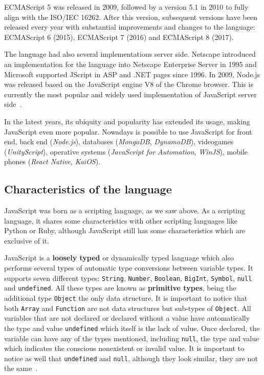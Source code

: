 \documentclass{uvamscse}
\begin{document}
ECMAScript 5 was released in 2009, followed by a version 5.1 in 2010 to fully align with the ISO/IEC 16262. After this version, subsequent versions have been released every year with substantial improvements and changes to the language: ECMAScript 6 (2015), ECMAScript 7 (2016) and ECMAScript 8 (2017).

The language had also several implementations server side. Netscape introduced an implementation for the language into Netscape Enterprise Server in 1995 and Microsoft supported JScript in ASP and .NET pages since 1996. In 2009, Node.js was released based on the JavaScript engine V8 of the Chrome browser. This is currently the most popular and widely used implementation of JavaScript server side~\cite{JSHisMDN,keith2011dom}.

In the latest years, its ubiquity and popularity has extended its usage, making JavaScript even more popular. Nowadays is possible to use JavaScript for front end, back end (\textit{Node.js}), databases (\textit{MongoDB}, \textit{DynamoDB}), videogames (\textit{UnityScript}), operative systems (\textit{JavaScript for Automation}, \textit{WinJS}), mobile phones (\textit{React Native}, \textit{KaiOS}).

\subsection{Characteristics of the language}
JavaScript was born as a scripting language, as we saw above. As a scripting language, it shares some characteristics with other scripting languages like Python or Ruby, although JavaScript still has some characteristics which are exclusive of it.

JavaScript is a \textbf{loosely typed} or dynamically typed language which also performs several types of automatic type conversions between variable types. It supports seven different types: \texttt{String}, \texttt{Number}, \texttt{Boolean}, \texttt{BigInt}, \texttt{Symbol}, \texttt{null} and \texttt{undefined}. All these types are known as \textbf{primitive types}, being the additional type \texttt{Object} the only data structure. It is important to notice that both \texttt{Array} and \texttt{Function} are not data structures but sub-types of \texttt{Object}. All variables that are not declared or declared without a value have automatically the type and value \texttt{undefined} which itself is the lack of value. Once declared, the variable can have any of the types mentioned, including \texttt{null}, the type and value which indicates the conscious nonexistent or invalid value. It is important to notice as well that \texttt{undefined} and \texttt{null}, although they look similar, they are not the same~\cite{MDNTypes,MDNNull,MDNUndefined}.
\end{document}
